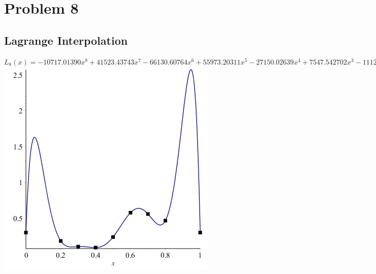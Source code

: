 \documentclass[11pt]{article} %
\begin{document}
{{\section*{Problem 8}
\subsection*{Lagrange Interpolation}
$L_8(x) = -10717.01390x^8 + 41523.43743x^7 - 66130.60764x^6 + 55973.20311x^5 - 27150.02639x^4 +7547.542702x^3 - 1112.916584x^2 + 66.38116670x + .302$\\
\includegraphics[scale=.5]{plots/problem7plot1.png}
}}
\end{document}

